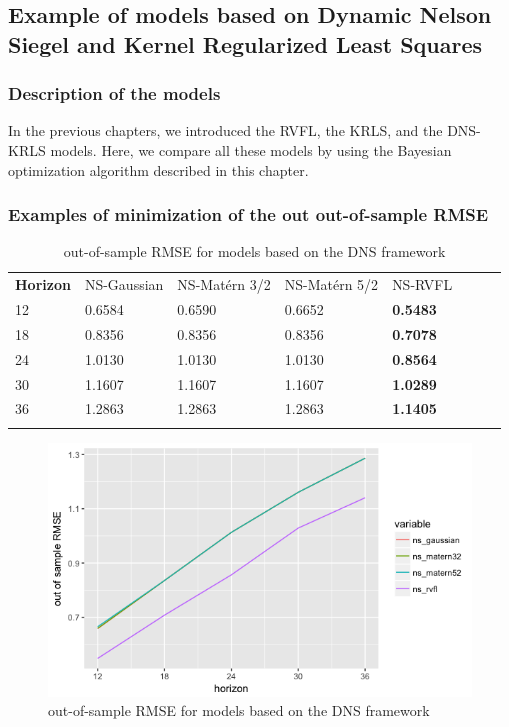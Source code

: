 \subsection{Example of models based on Dynamic Nelson Siegel and Kernel Regularized Least Squares}

\subsubsection{Description of the models}

In the previous chapters, we introduced the RVFL, the KRLS, and the DNS-KRLS models. Here, we compare all these models by using the Bayesian optimization algorithm described in this chapter.  

\subsubsection{Examples of minimization of the out out-of-sample RMSE}


\begin{table}[!htb]
\begin{center}
\caption{out-of-sample RMSE for models based on the DNS framework}
\label{tab:min_value_ns}       %
\begin{tabular}{llllllll}
\hline\noalign{\smallskip}
\textbf{Horizon} & NS-Gaussian & NS-Mat\'ern 3/2  & NS-Mat\'ern 5/2 & NS-RVFL \\
\noalign{\smallskip}\hline\noalign{\smallskip}
 12 & 0.6584  &  0.6590   &   0.6652 & \textbf{0.5483} \\
 18 & 0.8356  &  0.8356   &   0.8356 & \textbf{0.7078} \\
 24 & 1.0130  &  1.0130   &   1.0130 & \textbf{0.8564}\\
 30 & 1.1607  &  1.1607   &   1.1607 & \textbf{1.0289} \\
 36 & 1.2863  &  1.2863   &   1.2863 & \textbf{1.1405} \\
\noalign{\smallskip}\hline
\end{tabular}
\end{center}
\end{table}

\begin{figure}[!htb]
\centering
\includegraphics[width=12cm]{gfx/chapter-bayesianrvfl/oos_ns_krls.png}
\caption{out-of-sample RMSE for models based on the DNS framework}
\label{oos_ns_krls}
\end{figure}


